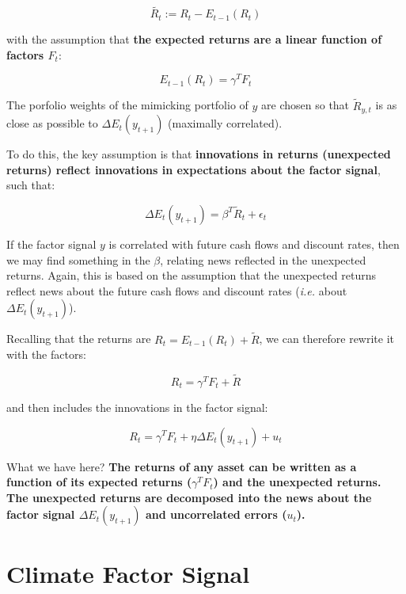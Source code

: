 \begin{equation}
    \tilde{R_t} := R_t - E_{t-1}(R_t)
\end{equation}

with the assumption that \textbf{the expected returns are a linear 
function of factors $F_{t}$}:

\begin{equation}
    E_{t-1}(R_t) = \gamma^T F_{t}
\end{equation}


The porfolio weights of the mimicking portfolio of $y$ 
are chosen so that $\tilde{R}_{y,t}$ is as close as possible
to $\Delta E_t(y_{t+1})$ (maximally correlated).

To do this, the key assumption is that 
\textbf{innovations in returns (unexpected returns)
reflect innovations in expectations about 
the factor signal}, such that:

\begin{equation}
    \Delta E_t(y_{t+1}) = \beta^T \tilde{R}_t + \epsilon_t
\end{equation}

If the factor signal $y$ is correlated 
with future cash flows and discount rates,
then we may find something in the $\beta$, relating
news reflected in the unexpected returns. 
Again, this is based on the assumption that 
the unexpected returns reflect news about the
future cash flows and discount rates (\textit{i.e.}
about $\Delta E_t(y_{t+1})$).

Recalling that the returns are $R_t = E_{t-1}(R_t) + \tilde{R}$,
we can therefore rewrite it with the factors:

\begin{equation}
    R_t = \gamma^T F_{t} + \tilde{R}
\end{equation}

and then includes the innovations in the factor signal:

\begin{equation}
    R_t = \gamma^T F_{t} + \eta \Delta E_t(y_{t+1}) + u_{t}
\end{equation}

What we have here? 
\textbf{The returns of any asset can be written 
as a function of its expected returns ($\gamma^T F_{t}$)
and the unexpected returns. The unexpected returns are 
decomposed into the news about the factor signal $\Delta E_t (y_{t+1})$ and
uncorrelated errors ($u_t$).}

\section{Climate Factor Signal}

